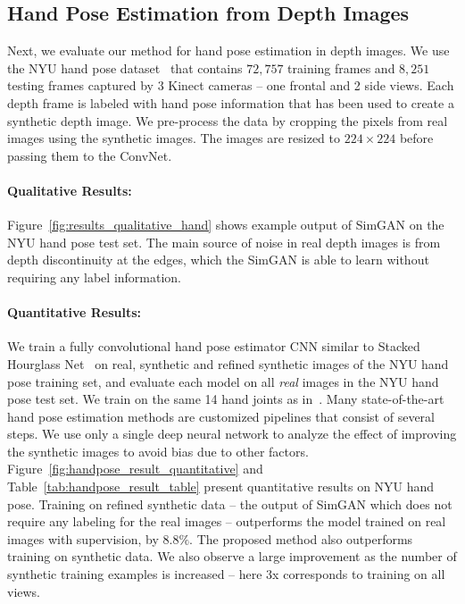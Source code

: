 \documentclass[10pt,twocolumn,letterpaper]{article}
\begin{document}
\subsection{Hand Pose Estimation from Depth Images}
Next, we evaluate our method for hand pose estimation in depth images. 
We use the NYU hand pose dataset~\cite{tompson14NYU} that contains $72,757$ training frames and $8,251$ testing frames captured by $3$ Kinect cameras -- one frontal and 2 side views. 
Each depth frame is labeled with hand pose information that has been used to create a synthetic depth image. 
We pre-process the data by cropping the pixels from real images using the synthetic images. 
The images are resized to $224 \times 224$ before passing them to the ConvNet.




\vspace{-0.15in}
\paragraph{Qualitative Results:}
Figure~\ref{fig:results_qualitative_hand} shows example output of SimGAN on the NYU hand pose test set. 
The main source of noise in real depth images is from depth discontinuity at the edges, which the SimGAN is able to learn without requiring any label information.


\vspace{-0.15in}
\paragraph{Quantitative Results:} 
We train a fully convolutional hand pose estimator CNN similar to Stacked Hourglass Net~\cite{Newell16} on real, synthetic and refined synthetic images of the NYU hand pose training set, and evaluate each model on all \emph{real} images in the NYU hand pose test set.
We train on the same 14 hand joints as in~\cite{tompson14NYU}.
Many state-of-the-art hand pose estimation methods are customized pipelines that consist of several steps.  
We use only a single deep neural network to analyze the effect of improving the synthetic images to avoid bias due to other factors. 
Figure~\ref{fig:handpose_result_quantitative} and Table~\ref{tab:handpose_result_table} present quantitative results on NYU hand pose.
Training on refined synthetic data -- the output of SimGAN which does not require any labeling for the real images --  outperforms the model trained on real images with supervision, by $8.8 \%$.
The proposed method also outperforms training on synthetic data.
We also observe a large improvement as the number of synthetic training examples is increased -- here 3x corresponds to training on all views.
\end{document}
